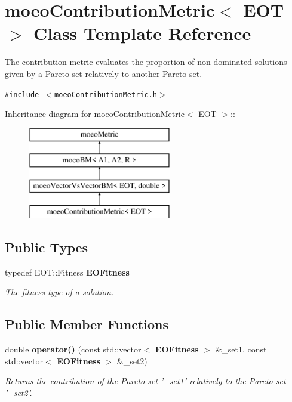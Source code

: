 \section{moeo\-Contribution\-Metric$<$ EOT $>$ Class Template Reference}
\label{classmoeoContributionMetric}
The contribution metric evaluates the proportion of non-dominated solutions given by a Pareto set relatively to another Pareto set.  


{\tt \#include $<$moeo\-Contribution\-Metric.h$>$}

Inheritance diagram for moeo\-Contribution\-Metric$<$ EOT $>$::\begin{figure}[H]
\begin{center}
\leavevmode
\includegraphics[height=4cm]{classmoeoContributionMetric}
\end{center}
\end{figure}
\subsection*{Public Types}
\begin{CompactItemize}
\item 
typedef EOT::Fitness {\bf EOFitness}\label{classmoeoContributionMetric_06c0247b9558eeb34e32c9a694924a66}

\begin{CompactList}\small\item\em The fitness type of a solution. \item\end{CompactList}\end{CompactItemize}
\subsection*{Public Member Functions}
\begin{CompactItemize}
\item 
double {\bf operator()} (const std::vector$<$ {\bf EOFitness} $>$ \&\_\-set1, const std::vector$<$ {\bf EOFitness} $>$ \&\_\-set2)
\begin{CompactList}\small\item\em Returns the contribution of the Pareto set '\_\-set1' relatively to the Pareto set '\_\-set2'. \item\end{CompactList}\end{CompactItemize}
